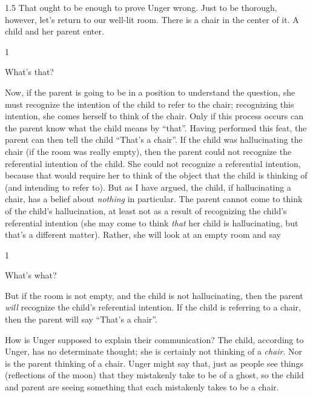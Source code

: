 \documentclass[11pt]{article}
\newcommand{\stage}[3]%
{%
	\begin{spacing}{1}%
	\vspace{0pt}
		\begin{description}[style=nextline, parsep=0pt, leftmargin=15mm, itemindent=-10mm, font=\mdseries]
			\item[\textsc{#1} \emph{#2}] #3
		\end{description}%
	\end{spacing}%
}
\begin{document}
\begin{spacing}{1.5}
That ought to be enough to prove Unger wrong. Just to be thorough, however, let's return to our well-lit room. There is a chair in the center of it. A child and her parent enter.

\stage{Child}{(pointing at the chair)}{What's that?}

Now, if the parent is going to be in a position to understand the question, she must recognize the intention of the child to refer to the chair; recognizing this intention, she comes herself to think of the chair. Only if this process occurs can the parent know what the child means by ``that''. Having performed this feat, the parent can then tell the child ``That's a chair''. If the child was hallucinating the chair (if the room was really empty), then the parent could not recognize the referential intention of the child. She could not recognize a referential intention, because that would require her to think of the object that the child is thinking of (and intending to refer to). But as I have argued, the child, if hallucinating a chair, has a belief about {\em nothing} in particular. The parent cannot come to think of the child's hallucination, at least not as a result of recognizing the child's referential intention (she may come to think {\em that} her child is hallucinating, but that's a different matter). Rather, she will look at an empty room and say

\stage{Parent}{}{What's what?}

But if the room is not empty, and the child is not hallucinating, then the parent {\em will} recognize the child's referential intention. If the child is referring to a chair, then the parent will say ``That's a chair''.

%
%

How is Unger supposed to explain their communication? The child, according to Unger, has no determinate thought; she is certainly not thinking of a {\em chair}. Nor is the parent thinking of a chair. Unger might say that, just as people see things (reflections of the moon) that they mistakenly take to be of a ghost, so the child and parent are seeing something that each mistakenly takes to be a chair.


\end{spacing}
\end{document}
